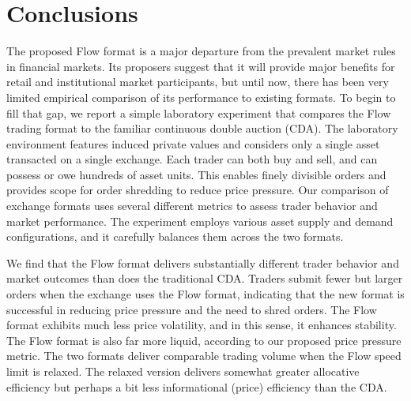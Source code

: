 \documentclass[12pt]{article}
\begin{document}
\section{Conclusions} 
\label{conclusion}

The proposed Flow format is a major departure from the prevalent market rules in financial markets. 
Its proposers {\citep{Kyle2017, Budish2023}} suggest that it will provide major benefits for retail and institutional market participants, but until now, there has been very limited empirical comparison of its performance to existing formats. 
To begin to fill that gap, we report a simple laboratory experiment that compares the Flow trading format to the familiar continuous double auction (CDA). 
The laboratory environment features induced private values and considers only a single asset transacted on a single exchange. 
Each trader can both buy and sell, and can possess or owe hundreds of asset units. This enables finely divisible orders and
provides scope for order shredding to reduce price pressure. 
Our comparison of exchange formats uses several different metrics to assess trader behavior and market performance.
The experiment employs various asset supply and demand configurations, and it carefully balances them across the two formats.




We find that the Flow format delivers substantially different trader behavior and market outcomes than does the traditional CDA.  
Traders submit fewer but larger orders when the exchange uses the Flow format, indicating that the new format is successful in reducing price pressure and the need to shred orders.
The Flow format exhibits much less price volatility, and in this sense, it enhances stability. 
The Flow format is also far more liquid, according to our proposed price pressure metric.
The two formats deliver comparable
trading volume when the Flow speed limit is relaxed. The relaxed version delivers somewhat greater allocative efficiency but perhaps a bit less 
informational (price) efficiency
than the CDA. 
\end{document}
